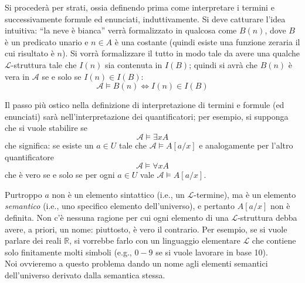 Si procederà per strati, ossia definendo prima come interpretare 
i termini e successivamente formule ed enunciati, induttivamente. 
Si deve catturare l'idea intuitiva: ``la neve è bianca'' verrà 
formalizzato in qualcosa come $B(n)$, dove $B$ è un predicato 
unario e $n \in A$ è una costante (quindi esiste una funzione zeraria 
il cui risultato è $n$). Si vorrà formalizzare il tutto in modo tale da avere una 
qualche $\mathscr{L}$-struttura tale che $I(n)$ sia contenuta in $I(B)$; quindi si avrà che 
$B(n)$ è vera in $\mathscr{A}$ se e solo se $I(n) \in I(B)$: 
$$
\mathscr{A} \models B(n) \iff I(n) \in I(B)
$$

Il passo più ostico nella definizione di interpretazione di termini 
e formule (ed enunciati) sarà nell'interpretazione dei quantificatori; 
per esempio, si supponga che si vuole stabilire se 
$$
\mathscr{A} \models \exists x A
$$
che significa: se esiste un $a \in U$ tale che $\mathscr{A} \models A[a/x]$
e  analogamente per l'altro quantificatore 
$$
\mathscr{A} \models \forall x A
$$
che è vero se e solo se per ogni $a \in U$ vale $\mathscr{A} \models A[a/x]$. 

Purtroppo $a$ non è un elemento sintattico (i.e., un $\mathscr{L}$-termine), ma è un elemento \textit{semantico} (i.e., uno specifico elemento dell'universo), e pertanto $A[a/x]$ non è definita.
Non c'è nessuna ragione per cui ogni elemento di una $\mathscr{L}$-struttura debba avere, a priori, un nome: piuttosto, è vero il contrario. Per esempio, se si vuole parlare dei reali $\mathbb{R}$, si vorrebbe farlo con un linguaggio elementare $\mathscr{L}$ che contiene solo finitamente molti simboli (e.g., $0-9$ se si vuole lavorare in base 10). \\
Noi ovvieremo a questo problema dando un nome agli elementi semantici dell'universo derivato dalla semantica stessa.

